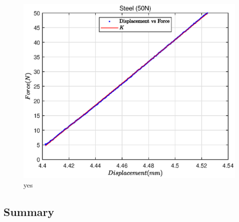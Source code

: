 \begin{figure}
    \centering
    \includegraphics[]{./fig/1.eps}
    \caption{yes}
    \label{1}
\end{figure}

\subsection*{Summary}